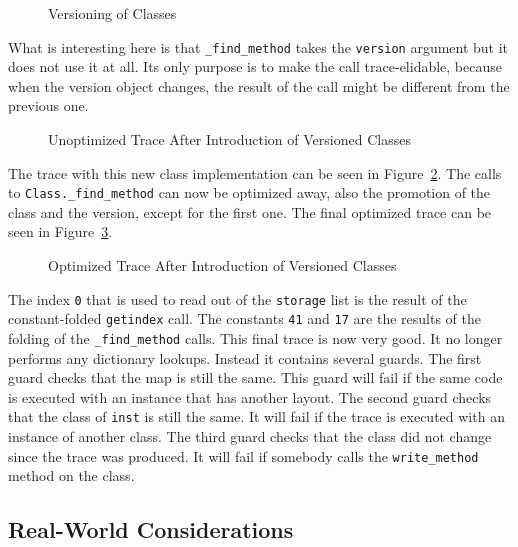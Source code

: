 \documentclass{sigplanconf}
\begin{document}
\begin{figure}

\caption{Versioning of Classes}
\label{fig:version}
\end{figure}

What is interesting here is that \texttt{\_find\_method} takes the \texttt{version}
argument but it does not use it at all. Its only purpose is to make the call
trace-elidable, because when the version object changes, the result of the call might be
different from the previous one.

\begin{figure}

\caption{Unoptimized Trace After Introduction of Versioned Classes}
\label{fig:trace4}
\end{figure}

The trace with this new class implementation can be seen in
Figure~\ref{fig:trace4}.
The calls to \texttt{Class.\_find\_method} can now be optimized away, also the
promotion of the class and the version, except for the first one. The final
optimized trace can be seen in Figure~\ref{fig:trace5}.

\begin{figure}

\caption{Optimized Trace After Introduction of Versioned Classes}
\label{fig:trace5}
\end{figure}

The index \texttt{0} that is used to read out of the \texttt{storage} list is the result
of the constant-folded \texttt{getindex} call.
The constants \texttt{41} and \texttt{17} are the results of the folding of the
\texttt{\_find\_method} calls. This final trace is now very good. It no longer performs any
dictionary lookups. Instead it contains several guards. The first guard
checks that the map is still the same. This guard will fail if the same
code is executed with an instance that has another layout. The second guard
checks that the class of \texttt{inst} is still the same. It will fail if the trace is
executed with an instance of another class. The third guard checks that the
class did not change since the trace was produced. It will fail if somebody
calls the \texttt{write\_method} method on the class.


\subsection{Real-World Considerations}
\end{document}
